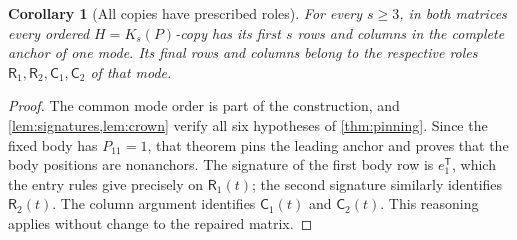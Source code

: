 \documentclass[11pt]{article}
\newtheorem{corollary}[theorem]{Corollary}
\theoremstyle{definition}
\newcommand{\Rset}{\mathsf R}
\newcommand{\Cset}{\mathsf C}
\begin{document}
\begin{corollary}[All copies have prescribed roles]
\label{cor:roles}
For every \(s\ge3\), in both matrices every ordered \(H=K_s(P)\)-copy
has its first \(s\) rows and columns in the complete anchor of one
mode. Its final rows and columns belong to the respective roles
\(\Rset_1,\Rset_2,\Cset_1,\Cset_2\) of that mode.
\end{corollary}
\begin{proof}
The common mode order is part of the construction, and
\cref{lem:signatures,lem:crown} verify all six hypotheses of
\cref{thm:pinning}. Since the fixed body has \(P_{11}=1\), that theorem
pins the leading anchor and proves that the body positions are nonanchors.
The signature of the first body row is \(e_1^{\mathsf T}\), which
the entry rules give precisely on \(\Rset_1(t)\); the second signature
similarly identifies \(\Rset_2(t)\). The column argument identifies
\(\Cset_1(t)\) and \(\Cset_2(t)\). This reasoning applies without
change to the repaired matrix.
\end{proof}





\begingroup\raggedright

\endgroup
\end{document}

